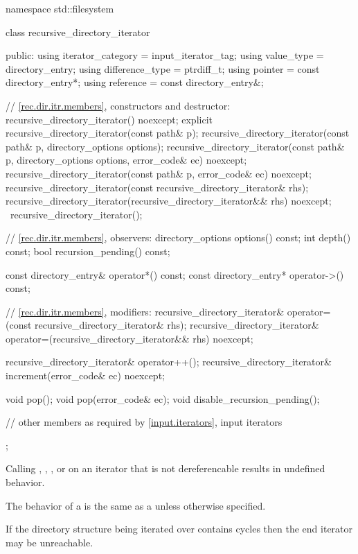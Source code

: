 \begin{codeblock}
namespace std::filesystem {
  class recursive_directory_iterator {
  public:
    using iterator_category = input_iterator_tag;
    using value_type        = directory_entry;
    using difference_type   = ptrdiff_t;
    using pointer           = const directory_entry*;
    using reference         = const directory_entry&;

    // \ref{rec.dir.itr.members}, constructors and destructor:
    recursive_directory_iterator() noexcept;
    explicit recursive_directory_iterator(const path& p);
    recursive_directory_iterator(const path& p, directory_options options);
    recursive_directory_iterator(const path& p, directory_options options,
                                 error_code& ec) noexcept;
    recursive_directory_iterator(const path& p, error_code& ec) noexcept;
    recursive_directory_iterator(const recursive_directory_iterator& rhs);
    recursive_directory_iterator(recursive_directory_iterator&& rhs) noexcept;
   ~recursive_directory_iterator();

    // \ref{rec.dir.itr.members}, observers:
    directory_options  options() const;
    int                depth() const;
    bool               recursion_pending() const;

    const directory_entry& operator*() const;
    const directory_entry* operator->() const;

    // \ref{rec.dir.itr.members}, modifiers:
    recursive_directory_iterator&
      operator=(const recursive_directory_iterator& rhs);
    recursive_directory_iterator&
      operator=(recursive_directory_iterator&& rhs) noexcept;

    recursive_directory_iterator& operator++();
    recursive_directory_iterator& increment(error_code& ec) noexcept;

    void pop();
    void pop(error_code& ec);
    void disable_recursion_pending();

    // other members as required by \ref{input.iterators}, input iterators
  };
}
\end{codeblock}

\pnum
Calling , , ,
 or 
on an iterator that is not dereferencable results in undefined behavior.

\pnum
The behavior of a  is the same
as a  unless otherwise specified.

\pnum
\begin{note} If the directory structure being iterated over contains cycles
then the end iterator may be unreachable. \end{note}

